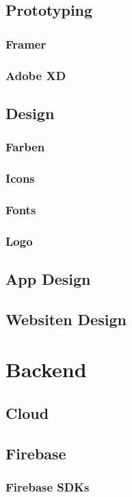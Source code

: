 \subsection{Prototyping}
\subsubsection{Framer}
\subsubsection{Adobe XD}


\subsection{Design}
\subsubsection{Farben}
\subsubsection{Icons}
\subsubsection{Fonts}
\subsubsection{Logo}
\subsection{App Design}
\subsection{Websiten Design}

\section{Backend}
\subsection{Cloud}
\subsection{Firebase}
\subsubsection{Firebase SDKs}

